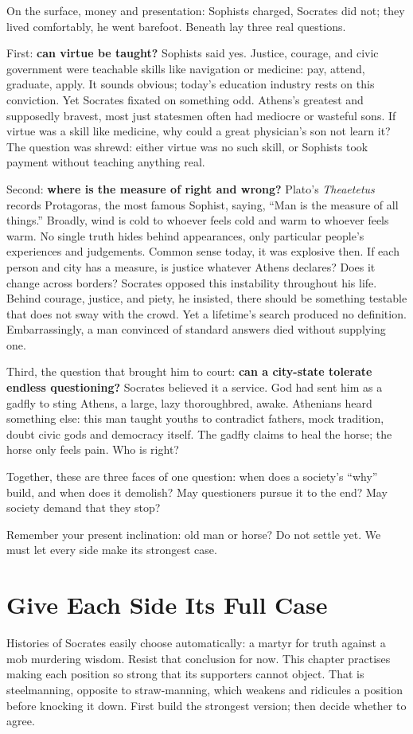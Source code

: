 On the surface, money and presentation: Sophists charged, Socrates did not; they lived comfortably, he went barefoot. Beneath lay three real questions.

First: \textbf{can virtue be taught?} Sophists said yes. Justice, courage, and civic government were teachable skills like navigation or medicine: pay, attend, graduate, apply. It sounds obvious; today's education industry rests on this conviction. Yet Socrates fixated on something odd. Athens's greatest and supposedly bravest, most just statesmen often had mediocre or wasteful sons. If virtue was a skill like medicine, why could a great physician's son not learn it? The question was shrewd: either virtue was no such skill, or Sophists took payment without teaching anything real.

Second: \textbf{where is the measure of right and wrong?} Plato's \textit{Theaetetus} records Protagoras, the most famous Sophist, saying, ``Man is the measure of all things.'' Broadly, wind is cold to whoever feels cold and warm to whoever feels warm. No single truth hides behind appearances, only particular people's experiences and judgements. Common sense today, it was explosive then. If each person and city has a measure, is justice whatever Athens declares? Does it change across borders? Socrates opposed this instability throughout his life. Behind courage, justice, and piety, he insisted, there should be something testable that does not sway with the crowd. Yet a lifetime's search produced no definition. Embarrassingly, a man convinced of standard answers died without supplying one.

Third, the question that brought him to court: \textbf{can a city-state tolerate endless questioning?} Socrates believed it a service. God had sent him as a gadfly to sting Athens, a large, lazy thoroughbred, awake. Athenians heard something else: this man taught youths to contradict fathers, mock tradition, doubt civic gods and democracy itself. The gadfly claims to heal the horse; the horse only feels pain. Who is right?

Together, these are three faces of one question: when does a society's ``why'' build, and when does it demolish? May questioners pursue it to the end? May society demand that they stop?

Remember your present inclination: old man or horse? Do not settle yet. We must let every side make its strongest case.

\section{Give Each Side Its Full Case}
Histories of Socrates easily choose automatically: a martyr for truth against a mob murdering wisdom. Resist that conclusion for now. This chapter practises making each position so strong that its supporters cannot object. That is steelmanning, opposite to straw-manning, which weakens and ridicules a position before knocking it down. First build the strongest version; then decide whether to agree.

